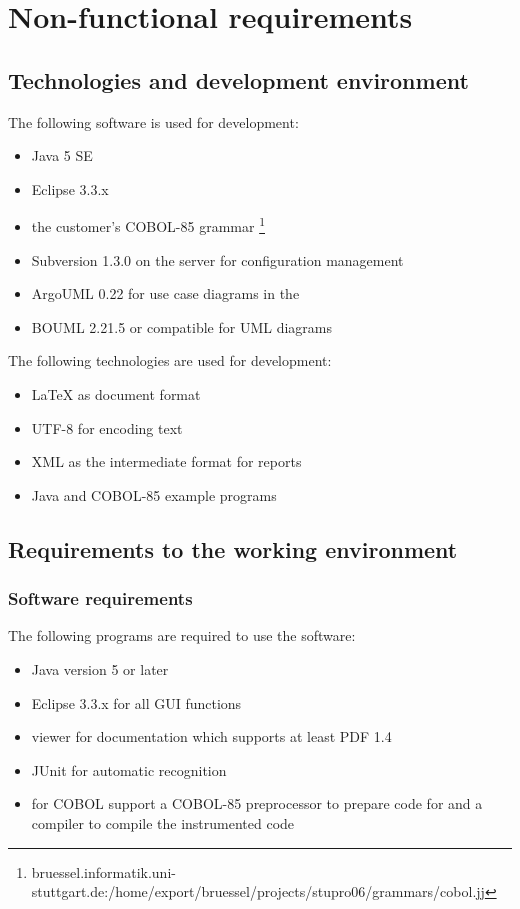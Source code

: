 \section{Non-functional requirements} \label{nf:Non-functional requirements}
\subsection{Technologies and development environment}
The following software is used for development:
\begin{itemize}
\item Java 5 SE
\item Eclipse 3.3.x
\item the customer's COBOL-85 grammar \footnote{bruessel.informatik.uni-stuttgart.de:/home/export/bruessel/projects/stupro06/grammars/cobol.jj}
\item Subversion 1.3.0 on the server for configuration management
\item ArgoUML 0.22 for use case diagrams in the 
\item BOUML 2.21.5 or compatible for UML diagrams

\end{itemize}
\par
The following technologies are used for development:
\begin{itemize}
\item LaTeX as document format
\item UTF-8 for encoding text
\item XML as the intermediate format for reports
\item Java and COBOL-85 example programs
\end{itemize}

\subsection{Requirements to the working environment}
\subsubsection{Software requirements}
The following programs are required to use the software:
\begin{itemize}
\item Java version 5 or later
\item Eclipse 3.3.x for all GUI functions
\item {} viewer for documentation which supports at least PDF 1.4
\item JUnit for automatic  recognition
\item for COBOL support a COBOL-85 preprocessor to prepare code for  and a compiler to compile the instrumented code
\end{itemize}

